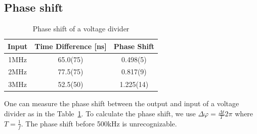 \documentclass[aps,prl,reprint]{revtex4-1}
\begin{document}
    \subsection{Phase shift}
    \begin{table}[h]
    \begin{ruledtabular}
    \begin{tabular}{ccc} 
    Input & Time Difference [ns] & Phase Shift\\
    \hline
    \hline
    1MHz & 65.0(75) & 0.498(5)\\ 
    \hline
    2MHz & 77.5(75) & 0.817(9)\\
    \hline
    3MHz & 52.5(50) & 1.225(14)\\
    \end{tabular}
    \end{ruledtabular}
    \caption{Phase shift of a voltage divider}
    \label{table:5}
    \end{table} 
    One can measure the phase shift between the output and input of a voltage divider as in the Table~\ref{table:5}. To calculate the phase shift, we use $\Delta \varphi = \frac{\Delta t}{T} 2\pi$ where $T = \frac{1}{f}$. The phase shift before 500kHz is unrecognizable.
\end{document}
